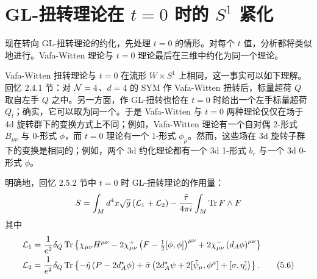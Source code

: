 \section{GL-扭转理论在 \texorpdfstring{$t=0$}{t=0} 时的 \texorpdfstring{$S^1$}{S1} 紧化}

现在转向 GL-扭转理论的约化，先处理 $t=0$ 的情形。对每个 $t$ 值，分析都将类似地进行。Vafa-Witten 理论与 $t=0$ 理论最后在三维中约化为同一个理论。

Vafa-Witten 扭转理论与 $t=0$ 在流形 $W\times S^1$ 上相同，这一事实可以如下理解。回忆 2.4.1 节：对 $\mathcal{N}=4$、$d=4$ 的 SYM 作 Vafa-Witten 扭转后，标量超荷 $Q$ 取自左手 $Q$ 之中。另一方面，作 GL-扭转也恰在 $t=0$ 时给出一个左手标量超荷 $Q_l$；确实，它可以取为同一个。于是 Vafa-Witten 与 $t=0$ 两种理论仅仅在场于 4d 旋转群下的变换方式上不同；例如，Vafa-Witten 理论有一个自对偶 2-形式 $B_{\mu\nu}$ 与 0-形式 $\phi$，而 $t=0$ 理论有一个 1-形式 $\phi_\mu$。然而，这些场在 3d 旋转子群下的变换是相同的；例如，两个 3d 约化理论都有一个 3d 1-形式 $b_r$ 与一个 3d 0-形式 $\phi$。

明确地，回忆 2.5.2 节中 $t=0$ 时 GL-扭转理论的作用量：
\[
    S = \int_M d^4x\sqrt{g}\left(\mathcal{L}_1+\mathcal{L}_2\right)
    - \frac{\bar\tau}{4\pi i}\int_M \operatorname{Tr} F\wedge F
\]
其中
\begin{align}
    \mathcal{L}_1 &= \frac{1}{e^2}\delta_Q\operatorname{Tr}\left\{\chi_{\mu\nu}H^{\mu\nu}
        - 2\chi_{\mu\nu}^+\left(F-\tfrac{1}{2}[\phi,\phi]\right)^{\mu\nu}
        + 2\chi_{\mu\nu}^-\left(d_A\phi\right)^{\mu\nu}\right\} \notag\\
    \mathcal{L}_2 &= \frac{1}{e^2}\delta_Q\operatorname{Tr}\left\{-\tilde\eta\left(P - 2d_A^\star\phi\right)
        + \bar\sigma\left(2d_A^\star\psi + 2[\tilde\psi_\mu,\phi^\mu] + [\sigma,\eta]\right)\right\} . \tag{5.6}
\end{align}


